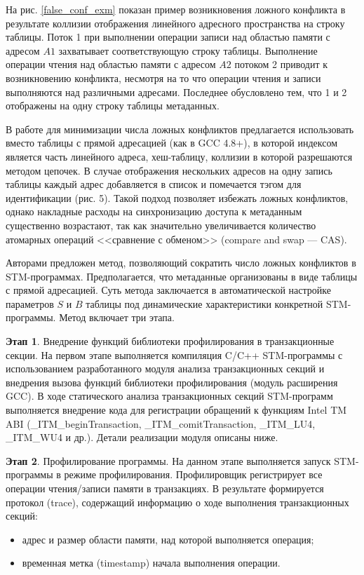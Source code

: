 На рис. \ref{false_conf_exm} показан пример возникновения ложного конфликта в 
результате коллизии отображения линейного адресного пространства на строку 
таблицы. Поток 1 при выполнении операции записи над областью памяти с адресом 
$A1$ захватывает соответствующую строку таблицы. Выполнение операции чтения над 
областью памяти с адресом $A2$ потоком 2 приводит к возникновению конфликта, 
несмотря на то что операции чтения и записи выполняются над различными адресами. 
Последнее обусловлено тем, что 1 и 2 отображены на одну строку таблицы 
метаданных.


В работе \cite{zilles_rajwar_false_conf} для минимизации числа ложных конфликтов 
предлагается использовать вместо таблицы с прямой адресацией (как в GCC 4.8+), в 
которой индексом является часть линейного адреса, хеш-таблицу, коллизии в 
которой разрешаются методом цепочек. В случае отображения нескольких адресов на 
одну запись таблицы каждый адрес добавляется в список и помечается тэгом для 
идентификации (рис. 5). Такой подход позволяет избежать ложных конфликтов, 
однако накладные расходы на синхронизацию доступа к метаданным существенно 
возрастают, так как значительно увеличивается количество атомарных операций 
<<сравнение с обменом>> (compare and swap --- CAS).


Авторами предложен метод, позволяющий сократить число ложных конфликтов в 
STM-программах. Предполагается, что метаданные организованы в виде таблицы с 
прямой адресацией. Суть метода заключается в автоматической настройке параметров 
$S$ и $B$ таблицы под динамические характеристики конкретной STM-программы. 
Метод включает три этапа.

\textbf{Этап 1}. Внедрение функций библиотеки профилирования в транзакционные 
секции. На первом этапе выполняется компиляция C/C++ STM-программы с 
использованием разработанного модуля анализа транзакционных секций и внедрения 
вызова функций библиотеки профилирования (модуль расширения GCC). В ходе 
статического анализа транзакционных секций STM-программ выполняется внедрение 
кода для регистрации обращений к функциям Intel TM ABI (\_ITM\_beginTransaction, 
\_ITM\_comitTransaction, \_ITM\_LU4, \_ITM\_WU4 и др.). Детали реализации модуля 
описаны ниже.

\textbf{Этап 2}. Профилирование программы. На данном этапе выполняется запуск 
STM-программы в режиме профилирования. Профилировщик регистрирует все операции 
чтения/записи памяти в транзакциях. В результате формируется протокол (trace), 
содержащий информацию о ходе выполнения транзакционных секций:
\begin{itemize}
\item адрес и размер области памяти, над которой выполняется операция;
\item временная метка (timestamp) начала выполнения операции.
\end{itemize}

